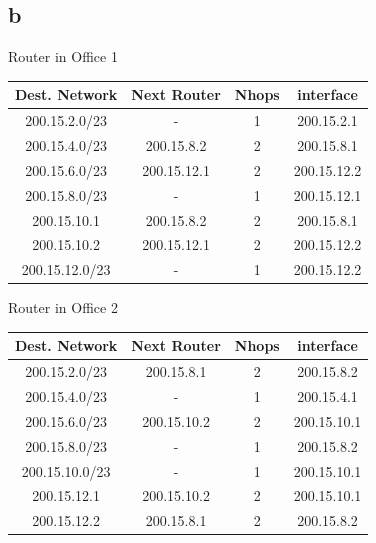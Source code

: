 \documentclass[a4paper, 11pt]{article}
\begin{document}
\subsection{b}
\begin{center}
	Router in Office 1
	\vspace{4mm}
	
	\begin{tabular}{|c|c|c|c|}
		\hline
		Dest. Network & Next Router & Nhops & interface \\ \hline
		200.15.2.0/23 & - & 1 & 200.15.2.1 \\ \hline
		200.15.4.0/23 & 200.15.8.2 & 2 & 200.15.8.1 \\ \hline
		200.15.6.0/23 & 200.15.12.1 & 2 & 200.15.12.2 \\ \hline
		200.15.8.0/23 & - & 1 & 200.15.12.1 \\ \hline
		200.15.10.1 & 200.15.8.2 & 2 & 200.15.8.1 \\ \hline
		200.15.10.2 & 200.15.12.1 & 2 & 200.15.12.2 \\ \hline
		200.15.12.0/23 & - & 1 & 200.15.12.2 \\ \hline
	\end{tabular}
\end{center}

\begin{center}
	Router in Office 2
	\vspace{4mm}
	
	\begin{tabular}{|c|c|c|c|}
		\hline
		Dest. Network & Next Router & Nhops & interface \\ \hline
		200.15.2.0/23 & 200.15.8.1 & 2 & 200.15.8.2 \\ \hline
		200.15.4.0/23 & - & 1 & 200.15.4.1 \\ \hline
		200.15.6.0/23 & 200.15.10.2 & 2 & 200.15.10.1 \\ \hline
		200.15.8.0/23 & - & 1 & 200.15.8.2 \\ \hline
		200.15.10.0/23 & - & 1 & 200.15.10.1 \\ \hline
		200.15.12.1 & 200.15.10.2 & 2 & 200.15.10.1 \\ \hline
		200.15.12.2 & 200.15.8.1 & 2 & 200.15.8.2 \\ \hline
	\end{tabular}
\end{center}
\end{document}

